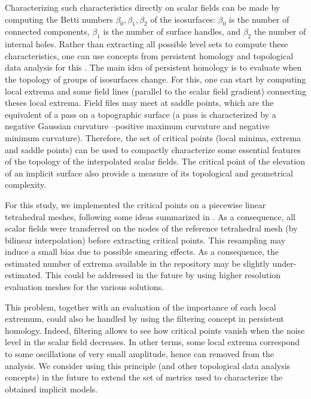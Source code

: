 \documentclass[preprint]{ring20}
\begin{document}
Characterizing such characteristics directly on scalar fields can be made by computing the Betti numbers $\beta_0, \beta_1, \beta_2$ of the isosurfaces: $\beta_0$ is the number of connected components, $\beta_1$ is the number of surface handles, and $\beta_2$ the number of internal holes. Rather than extracting all possible level sets to compute these characteristics, one can use concepts from persistent homology and topological data analysis for this \citep[e.g.,][]{Chazal2017ACMS,Tierny2017,Wasserman2018}. The main idea of persistent homology is to evaluate when the topology of groups of isosurfaces change. For this, one can start by computing local extrema and some field lines (parallel to the scalar field gradient) connecting theses local extrema. Field files may meet at saddle points, which are the equivalent of a pass on a topographic surface (a pass is characterized by a negative Gaussian curvature --positive maximum curvature and negative minimum curvature). Therefore, the set of critical points (local minima, extrema and saddle points) can be used to compactly characterize some essential features of the topology of the interpolated scalar fields. The critical point of the elevation of an implicit surface also provide a measure of its topological and geometrical complexity. 

For this study, we implemented the critical points on a piecewise linear tetrahedral meshes, following some ideas summarized in \citet{Tierny2017}. As a consequence, all scalar fields were transferred on the nodes of the reference tetrahedral mesh (by bilinear interpolation) before extracting critical points. This resampling may induce a small bias due to possible smearing effects. As a consequence, the estimated number of extrema available in the repository may be slightly under-estimated. 
This could be addressed in the future by using higher resolution evaluation meshes for the various solutions. 

This problem, together with an evaluation of the importance of each local extremum, could also be handled by using the filtering concept in persistent homology. Indeed, filtering allows to see how critical points vanish when the noise level in the scalar field decreases. In other terms, some local extrema correspond to some oscillations of very small amplitude, hence can removed from the analysis. We consider using this principle (and other topological data analysis concepts) in the future to extend the set of metrics used to characterize the obtained implicit models. 
\end{document}
